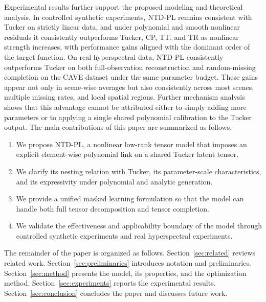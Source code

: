 Experimental results further support the proposed modeling and theoretical analysis. In controlled synthetic experiments, NTD-PL remains consistent with Tucker on strictly linear data, and under polynomial and smooth nonlinear residuals it consistently outperforms Tucker, CP, TT, and TR as nonlinear strength increases, with performance gains aligned with the dominant order of the target function. On real hyperspectral data, NTD-PL consistently outperforms Tucker on both full-observation reconstruction and random-missing completion on the CAVE dataset under the same parameter budget. These gains appear not only in scene-wise averages but also consistently across most scenes, multiple missing rates, and local spatial regions. Further mechanism analysis shows that this advantage cannot be attributed either to simply adding more parameters or to applying a single shared polynomial calibration to the Tucker output. The main contributions of this paper are summarized as follows.

\begin{enumerate}
    \item We propose NTD-PL, a nonlinear low-rank tensor model that imposes an explicit element-wise polynomial link on a shared Tucker latent tensor.
    \item We clarify its nesting relation with Tucker, its parameter-scale characteristics, and its expressivity under polynomial and analytic generation.
    \item We provide a unified masked learning formulation so that the model can handle both full tensor decomposition and tensor completion.
    \item We validate the effectiveness and applicability boundary of the model through controlled synthetic experiments and real hyperspectral experiments.
\end{enumerate}

The remainder of the paper is organized as follows. Section~\ref{sec:related} reviews related work. Section~\ref{sec:preliminaries} introduces notation and preliminaries. Section~\ref{sec:method} presents the model, its properties, and the optimization method. Section~\ref{sec:experiments} reports the experimental results. Section~\ref{sec:conclusion} concludes the paper and discusses future work.
